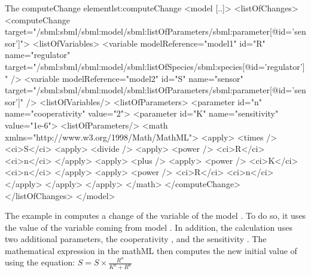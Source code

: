 \begin{myXmlLst}{The computeChange element}{lst:computeChange}
<model [..]>
	<listOfChanges>
	<computeChange target="/sbml:sbml/sbml:model/sbml:listOfParameters/sbml:parameter[@id='sensor']">
		<listOfVariables>
			<variable modelReference="model1" id="R" name="regulator" 
				target="/sbml:sbml/sbml:model/sbml:listOfSpecies/sbml:species[@id='regulator']" />
			<variable modelReference="model2" id="S" name="sensor"
				target="/sbml:sbml/sbml:model/sbml:listOfParameters/sbml:parameter[@id='sensor']" />
		<listOfVariables/>
		<listOfParameters>
			<parameter id="n" name="cooperativity" value="2">
			<parameter id="K" name="sensitivity" value="1e-6">
		<listOfParameters/>
		<math  xmlns="http://www.w3.org/1998/Math/MathML">
        <apply>
          <times />
          <ci>S</ci>
          <apply>
            <divide />
            <apply>
              <power />
              <ci>R</ci>
              <ci>n</ci>
            </apply>
            <apply>
              <plus />
              <apply>
                <power />
                <ci>K</ci>
                <ci>n</ci>
              </apply>
              <apply>
                <power />
                <ci>R</ci>
                <ci>n</ci>
              </apply>
            </apply> 
		</apply>
		</math>
	</computeChange>
	</listOfChanges>
</model>
\end{myXmlLst}

The example in  computes a change of the variable  of the model . To do so, it uses the value of the variable  coming from model . In addition, the calculation uses two additional parameters, the cooperativity , and the sensitivity . The mathematical expression in the mathML then computes the new initial value of  using the equation:
\begin{math}
S =  S \times \frac{R^{n}}{K^{n}+R^{n}}
\end{math}
